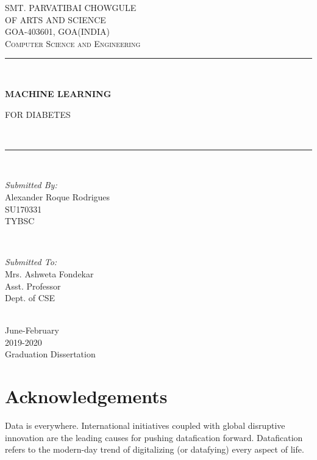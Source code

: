 \documentclass[12pt]{article}
\begin{document}
\begin{titlepage}
\newcommand{\HRule}{\rule{\linewidth}{0.5mm}} 
\center
\textsc{\LARGE SMT. PARVATIBAI CHOWGULE }\\[0.3cm] 
\textsc{\LARGE OF ARTS AND SCIENCE  }\\[0.3cm]
\textsc{\Large GOA-403601, GOA(INDIA) }\\[0.3cm]
\textsc{\Large Computer Science and Engineering}\\[0.5cm] 

\HRule \\[0.4cm] 
{ \huge \bfseries MACHINE LEARNING\par FOR DIABETES}\\[0.04cm] 
\HRule \\[1.5cm]

 
\begin{minipage}{0.4\textwidth}
\begin{flushleft} \large
\emph{Submitted By:}\\
Alexander Roque Rodrigues\\SU170331\\TYBSC
\end{flushleft}
\end{minipage}
~
\begin{minipage}{0.4\textwidth}
\begin{flushright} \large
\emph{Submitted To:} \\
Mrs. Ashweta Fondekar\\Asst. Professor\\Dept. of CSE 
\end{flushright}
\end{minipage}\\[1cm]


{\large June-February\\2019-2020 \\Graduation Dissertation}\\[1cm] 

\newpage
\tableofcontents
\vfill
\end{titlepage}


\section{Acknowledgements}
Data is everywhere. International initiatives coupled with global disruptive innovation are the leading causes for pushing datafication forward. Datafication refers to the modern-day trend of digitalizing (or datafying) every aspect of life.
\end{document}
